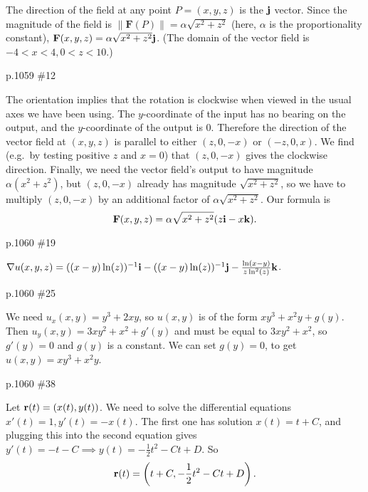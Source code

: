 \begin{pracsol}
  The direction of the field at any point $P=(x,y,z)$ is the $\mathbf j$ vector. Since the magnitude of the field is $\|\mathbf F(P)\|=\alpha\sqrt{x^2+z^2}$ (here, $\alpha$ is the proportionality constant), $\mathbf F(x,y,z)=\alpha\sqrt{x^2+z^2}\mathbf j$.  (The domain of the vector field is $-4<x<4,0<z<10$.)
\end{pracsol}
\begin{practice}p.1059 \#12\end{practice}
\begin{pracsol}
  The orientation implies that the rotation is clockwise when viewed in the usual axes we have been using. The $y$-coordinate of the input has no bearing on the output, and the $y$-coordinate of the output is 0. Therefore the direction of the vector field at $(x,y,z)$ is parallel to either $(z,0,-x)$ or $(-z,0,x)$. We find (e.g.\ by testing positive $z$ and $x=0$) that $(z,0,-x)$ gives the clockwise direction. Finally, we need the vector field's output to have magnitude $\alpha(x^2+z^2)$, but $(z,0,-x)$ already has magnitude $\sqrt{x^2+z^2}$, so we have to multiply $(z,0,-x)$ by an additional factor of $\alpha\sqrt{x^2+z^2}$. Our formula is
  \[\mathbf F(x,y,z)=\alpha\sqrt{x^2+z^2}(z\mathbf i-x\mathbf k).\]
\end{pracsol}
\begin{practice}p.1060 \#19\end{practice}
\begin{pracsol}
  $\nabla u(x,y,z)=((x-y)\ln(z))^{-1}\mathbf i-((x-y)\ln(z))^{-1}\mathbf j-\frac{\ln(x-y)}{z \ln^2(z)}\mathbf k$.
\end{pracsol}
\begin{practice}p.1060 \#25\end{practice}
\begin{pracsol}
  We need $u_x(x,y)=y^3+2xy$, so $u(x,y)$ is of the form $xy^3+x^2y+g(y)$. Then $u_y(x,y)=3xy^2+x^2+g'(y)$ and must be equal to $3xy^2+x^2$, so $g'(y)=0$ and $g(y)$ is a constant. We can set $g(y)=0$, to get $u(x,y)=xy^3+x^2y$.
\end{pracsol}
\begin{practice}p.1060 \#38\end{practice}
\begin{pracsol}
  Let $\mathbf r(t)=(x(t),y(t))$. We need to solve the differential equations $x'(t)=1,y'(t)=-x(t)$. The first one has solution $x(t)=t+C$, and plugging this into the second equation gives $y'(t)=-t-C\implies y(t)=-\frac12t^2-Ct+D$. So
  \[\mathbf r(t)=\left(t+C,-\frac12t^2-Ct+D\right).\]
\end{pracsol}

